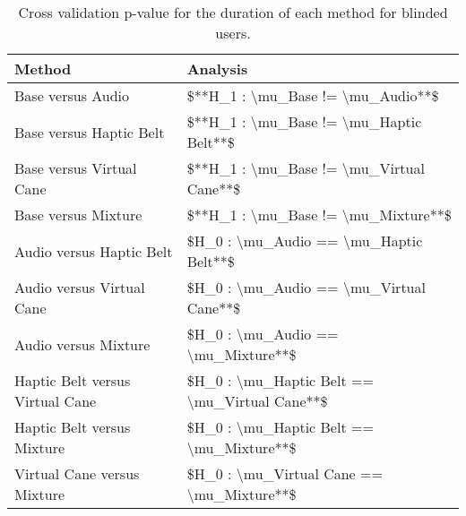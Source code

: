 
\begin{table}[!htb]
\centering
\caption{Cross validation p-value for the duration of each method for blinded users.}
\label{tab:lsd_duration_var}
\begin{tabular}{ll}
\toprule
                         Method &                                      Analysis \\
\midrule
              Base versus Audio &             \$**H\_1 : \textbackslash mu\_Base != \textbackslash mu\_Audio**\$ \\
        Base versus Haptic Belt &       \$**H\_1 : \textbackslash mu\_Base != \textbackslash mu\_Haptic Belt**\$ \\
       Base versus Virtual Cane &      \$**H\_1 : \textbackslash mu\_Base != \textbackslash mu\_Virtual Cane**\$ \\
            Base versus Mixture &           \$**H\_1 : \textbackslash mu\_Base != \textbackslash mu\_Mixture**\$ \\
       Audio versus Haptic Belt &        \$H\_0 : \textbackslash mu\_Audio == \textbackslash mu\_Haptic Belt**\$ \\
      Audio versus Virtual Cane &       \$H\_0 : \textbackslash mu\_Audio == \textbackslash mu\_Virtual Cane**\$ \\
           Audio versus Mixture &            \$H\_0 : \textbackslash mu\_Audio == \textbackslash mu\_Mixture**\$ \\
Haptic Belt versus Virtual Cane & \$H\_0 : \textbackslash mu\_Haptic Belt == \textbackslash mu\_Virtual Cane**\$ \\
     Haptic Belt versus Mixture &      \$H\_0 : \textbackslash mu\_Haptic Belt == \textbackslash mu\_Mixture**\$ \\
    Virtual Cane versus Mixture &     \$H\_0 : \textbackslash mu\_Virtual Cane == \textbackslash mu\_Mixture**\$ \\
\bottomrule
\end{tabular}
\end{table}

